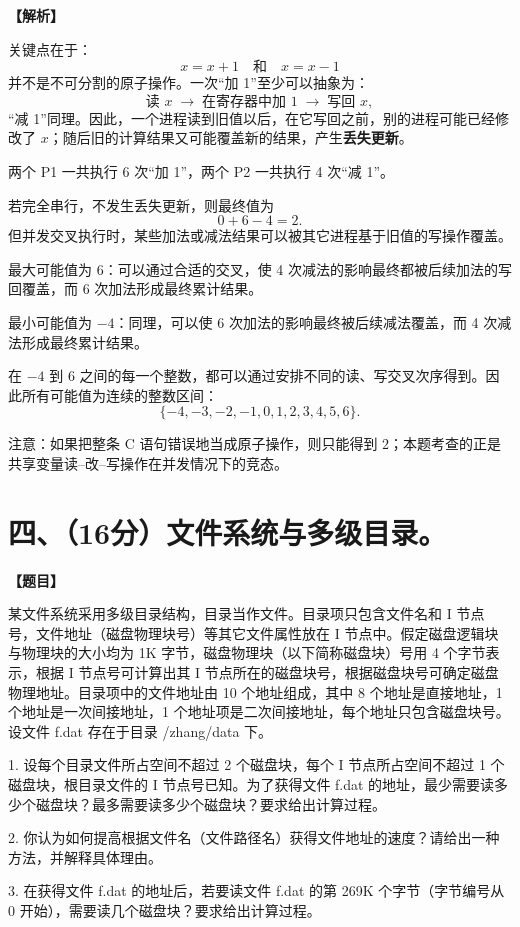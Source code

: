 \documentclass[UTF8,12pt]{ctexart}
\newenvironment{question}{\par\medskip\noindent\textbf{【题目】}\par\smallskip}{\par\medskip}
\newenvironment{explanation}{\par\noindent\textbf{【解析】}\par\smallskip}{\par\medskip}
\begin{document}
\begin{explanation}
关键点在于：
\[
x=x+1\quad\text{和}\quad x=x-1
\]
并不是不可分割的原子操作。一次“加 1”至少可以抽象为：
\[
\text{读 }x\;\longrightarrow\;\text{在寄存器中加 1}\;\longrightarrow\;\text{写回 }x,
\]
“减 1”同理。因此，一个进程读到旧值以后，在它写回之前，别的进程可能已经修改了 $x$；随后旧的计算结果又可能覆盖新的结果，产生\textbf{丢失更新}。

两个 P1 一共执行 6 次“加 1”，两个 P2 一共执行 4 次“减 1”。

若完全串行，不发生丢失更新，则最终值为
\[
0+6-4=2.
\]
但并发交叉执行时，某些加法或减法结果可以被其它进程基于旧值的写操作覆盖。

最大可能值为 $6$：可以通过合适的交叉，使 4 次减法的影响最终都被后续加法的写回覆盖，而 6 次加法形成最终累计结果。

最小可能值为 $-4$：同理，可以使 6 次加法的影响最终被后续减法覆盖，而 4 次减法形成最终累计结果。

在 $-4$ 到 $6$ 之间的每一个整数，都可以通过安排不同的读、写交叉次序得到。因此所有可能值为连续的整数区间：
\[
\boxed{\{-4,-3,-2,-1,0,1,2,3,4,5,6\}}.
\]

注意：如果把整条 C 语句错误地当成原子操作，则只能得到 $2$；本题考查的正是共享变量读--改--写操作在并发情况下的竞态。
\end{explanation}

\section*{四、（16分）文件系统与多级目录。}

\begin{question}
某文件系统采用多级目录结构，目录当作文件。目录项只包含文件名和 I 节点号，文件地址（磁盘物理块号）等其它文件属性放在 I 节点中。假定磁盘逻辑块与物理块的大小均为 1K 字节，磁盘物理块（以下简称磁盘块）号用 4 个字节表示，根据 I 节点号可计算出其 I 节点所在的磁盘块号，根据磁盘块号可确定磁盘物理地址。目录项中的文件地址由 10 个地址组成，其中 8 个地址是直接地址，1 个地址是一次间接地址，1 个地址项是二次间接地址，每个地址只包含磁盘块号。设文件 f.dat 存在于目录 /zhang/data 下。

1. 设每个目录文件所占空间不超过 2 个磁盘块，每个 I 节点所占空间不超过 1 个磁盘块，根目录文件的 I 节点号已知。为了获得文件 f.dat 的地址，最少需要读多少个磁盘块？最多需要读多少个磁盘块？要求给出计算过程。

2. 你认为如何提高根据文件名（文件路径名）获得文件地址的速度？请给出一种方法，并解释具体理由。

3. 在获得文件 f.dat 的地址后，若要读文件 f.dat 的第 269K 个字节（字节编号从 0 开始），需要读几个磁盘块？要求给出计算过程。
\end{question}
\end{document}
